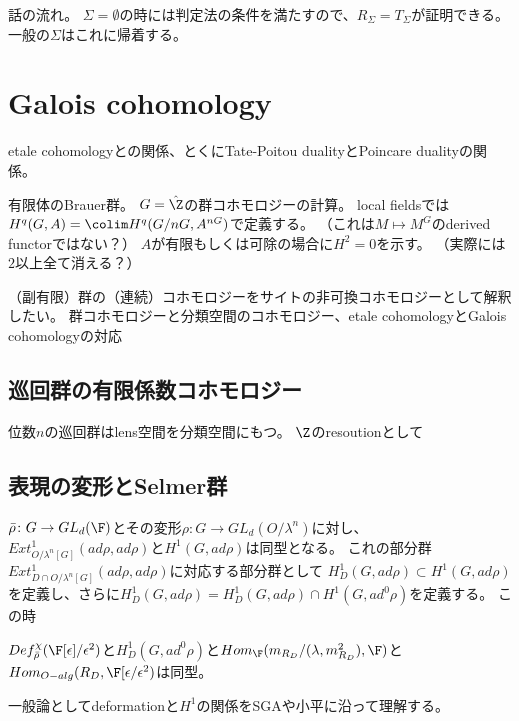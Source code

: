 \documentclass{jsarticle}
\begin{document}
話の流れ。
$\Sigma=\emptyset$の時には判定法の条件を満たすので、$R_\Sigma=T_\Sigma$が証明できる。
一般の$\Sigma$はこれに帰着する。
\section{Galois cohomology}
etale cohomologyとの関係、とくにTate-Poitou dualityとPoincare dualityの関係。

有限体のBrauer群。
$G=\hat{\Z}$の群コホモロジーの計算。
local fieldsでは$H^q(G,A)=\colim H^q(G/nG,A^{nG})$で定義する。
（これは$M\mapsto M^G$のderived functorではない？）
$A$が有限もしくは可除の場合に$H^2=0$を示す。
（実際には$2$以上全て消える？）

（副有限）群の（連続）コホモロジーをサイトの非可換コホモロジーとして解釈したい。
群コホモロジーと分類空間のコホモロジー、etale cohomologyとGalois cohomologyの対応

\subsection{巡回群の有限係数コホモロジー}
位数$n$の巡回群はlens空間を分類空間にもつ。
$\Z$のresoutionとして

\subsection{表現の変形とSelmer群}
$\bar{\rho}\colon G\to GL_d(\F)$とその変形$\rho\colon G\to GL_d(O/\lambda^n)$に対し、
$Ext^1_{O/\lambda^n[G]}(ad\rho,ad\rho)$と$H^1(G,ad\rho)$は同型となる。
これの部分群$Ext^1_{D\cap O/\lambda^n[G]}(ad\rho,ad\rho)$に対応する部分群として
$H^1_D(G,ad\rho)\subset H^1(G,ad\rho)$を定義し、さらに$H^1_D(G,ad\rho)=H^1_D(G,ad\rho)\cap H^1(G,ad^0\rho)$を定義する。
この時
\begin{prob}
$Def^\chi_{\bar{\rho}}(\F[\epsilon]/\epsilon^2)$と$H^1_D(G,ad^0\rho)$と$Hom_{\F}(m_{R_D}/(\lambda,m^2_{R_D}),\F)$と
$Hom_{O-alg}(R_D,\F[\epsilon/\epsilon^2)$は同型。
\end{prob}

一般論としてdeformationと$H^1$の関係をSGAや小平に沿って理解する。
\end{document}
